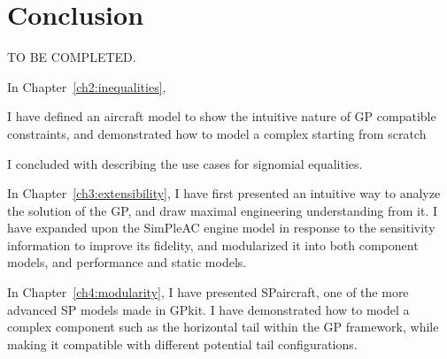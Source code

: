 \chapter{Conclusion}
\label{ch5:conclusion}

TO BE COMPLETED.

In Chapter~\ref{ch2:inequalities},

I have defined an aircraft model to show the intuitive nature of \gls{GP}
compatible constraints, and demonstrated how to model a complex
starting from scratch

I concluded with describing the use cases for signomial equalities.

In Chapter~\ref{ch3:extensibility}, I have first presented an intuitive
way to analyze the solution of the \gls{GP}, and draw maximal engineering
understanding from it. I have expanded upon the SimPleAC engine model
in response to the sensitivity information to improve its fidelity,
and modularized it into both component models, and performance and static models.


In Chapter~\ref{ch4:modularity}, I have presented SPaircraft, one of the more
advanced \gls{SP} models made in GPkit. I have demonstrated how to model
a complex component such as the horizontal tail within the GP framework,
while making it compatible with different potential tail configurations.
